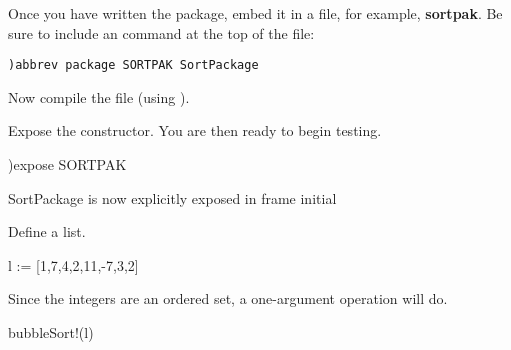 %
Once you have written the package, embed it in a file, for example,
{\bf sortpak\spadFileExt{}}.
Be sure to include an  command at the top of the file:
\begin{verbatim}
)abbrev package SORTPAK SortPackage
\end{verbatim}
Now compile the file (using ).
\begin{xtc}
\begin{xtccomment}
Expose the constructor.
You are then ready to begin testing.
\end{xtccomment}
\begin{spadsrc}
)expose SORTPAK
\end{spadsrc}
\begin{SysCmdOutput}
   SortPackage is now explicitly exposed in frame initial 
\end{SysCmdOutput}
\end{xtc}
\begin{xtc}
\begin{xtccomment}
Define a list.
\end{xtccomment}
\begin{spadsrc}
l := [1,7,4,2,11,-7,3,2]
\end{spadsrc}
\begin{TeXOutput}
\begin{fricasmath}{1}
%
\end{fricasmath}
\end{TeXOutput}
\end{xtc}
\begin{xtc}
\begin{xtccomment}
Since the integers are an ordered set,
a one-argument operation will do.
\end{xtccomment}
\begin{spadsrc}
bubbleSort!(l)
\end{spadsrc}
\begin{TeXOutput}
\begin{fricasmath}{2}
%
\end{fricasmath}
\end{TeXOutput}
\end{xtc}
